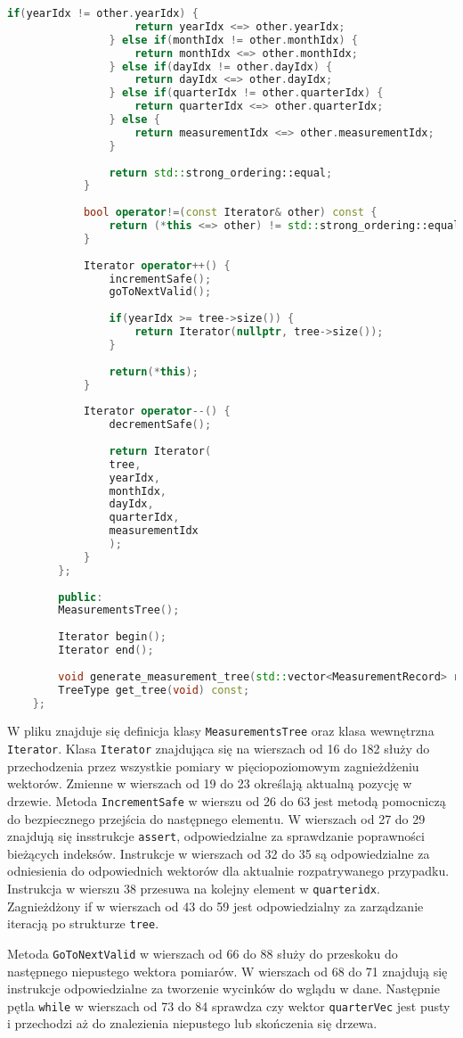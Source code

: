 \begin{lstlisting}[caption=Zawartość pliku \texttt{MeasurementsTree.hpp}, label={lst:measurementreehpp}, language=C++]
				if(yearIdx != other.yearIdx) {
					return yearIdx <=> other.yearIdx;
				} else if(monthIdx != other.monthIdx) {
					return monthIdx <=> other.monthIdx;
				} else if(dayIdx != other.dayIdx) {
					return dayIdx <=> other.dayIdx;
				} else if(quarterIdx != other.quarterIdx) {
					return quarterIdx <=> other.quarterIdx;
				} else {
					return measurementIdx <=> other.measurementIdx;
				} 
				
				return std::strong_ordering::equal;
			}	
			
			bool operator!=(const Iterator& other) const {
				return (*this <=> other) != std::strong_ordering::equal;
			}	
			
			Iterator operator++() {
				incrementSafe();
				goToNextValid();
				
				if(yearIdx >= tree->size()) {
					return Iterator(nullptr, tree->size());
				}
				
				return(*this);
			}
			
			Iterator operator--() {
				decrementSafe();
				
				return Iterator(
				tree,
				yearIdx,
				monthIdx,
				dayIdx,
				quarterIdx,
				measurementIdx
				);
			}
		};
		
		public:
		MeasurementsTree();
		
		Iterator begin(); 
		Iterator end(); 
		
		void generate_measurement_tree(std::vector<MeasurementRecord> records);
		TreeType get_tree(void) const;
	};
\end{lstlisting}

W pliku znajduje się definicja klasy \texttt{MeasurementsTree} oraz klasa wewnętrzna \texttt{Iterator}.
Klasa \texttt{Iterator} znajdująca się na wierszach od 16 do 182 służy do przechodzenia przez wszystkie pomiary w pięciopoziomowym zagnieżdżeniu wektorów. Zmienne w wierszach od 19 do 23 określają aktualną pozycję w drzewie.	Metoda \texttt{IncrementSafe} w wierszu od 26 do 63 jest metodą pomocniczą do bezpiecznego przejścia do następnego elementu. W wierszach od 27 do 29 znajdują się insstrukcje \texttt{assert}, odpowiedzialne za sprawdzanie poprawności bieżących indeksów. Instrukcje w wierszach od 32 do 35 są odpowiedzialne za odniesienia do odpowiednich wektorów dla aktualnie rozpatrywanego przypadku. Instrukcja w wierszu 38 przesuwa na kolejny element w \texttt{quarteridx}. Zagnieżdżony if w wierszach od 43 do 59 jest odpowiedzialny za zarządzanie iteracją po strukturze \texttt{tree}.

Metoda \texttt{GoToNextValid} w wierszach od 66 do 88 służy do przeskoku do następnego niepustego wektora pomiarów. W wierszach od 68 do 71 znajdują się instrukcje odpowiedzialne za tworzenie wycinków do wglądu w dane. Następnie pętla \texttt{while} w wierszach od 73 do 84 sprawdza czy wektor \texttt{quarterVec} jest pusty i przechodzi aż do znalezienia niepustego lub skończenia się drzewa.


